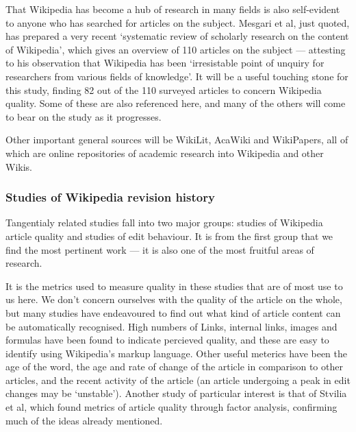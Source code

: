 \documentclass[a4paper,11pt,twoside,notitlepage]{article}
\begin{document}
        That Wikipedia has become a hub of research in many fields is
        also self-evident to anyone who has searched for articles on
        the subject. Mesgari et al, just quoted, has prepared a very
        recent `systematic review of scholarly research on the content
        of Wikipedia', which gives an overview of 110 articles on the
        subject --- attesting to his observation that Wikipedia
        has been `irresistable point of unquiry for researchers from
        various fields of knowledge'. It will be a useful touching
        stone for this study, finding 82 out of the 110 surveyed
        articles to concern Wikipedia quality. Some of these are also
        referenced here, and many of the others will come to bear on
        the study as it progresses.

        Other important general sources will be WikiLit,\cite{wikilit}
        AcaWiki\cite{acawiki} and WikiPapers\cite{wikipapers}, all of
        which are online repositories of academic research into
        Wikipedia and other Wikis.       

        
        \subsubsection*{Studies of Wikipedia revision history}
        Tangentialy related studies fall into two major groups: studies
        of Wikipedia article quality and studies of edit behaviour.
        It is from the first group that we find the most pertinent
        work --- it is also one of the most fruitful areas of
        research.

        It is the metrics used to measure quality in these studies
        that are of most use to us here. We don't concern ourselves
        with the quality of the article on the whole, but many studies
        have endeavoured to find out what kind of article content can
        be automatically recognised. High numbers of Links, internal
        links, images and formulas have been found to indicate
        percieved quality,\cite{Lucassen2010}\cite{mcguinness2006} and
        these are easy to identify using Wikipedia's markup
        language. Other useful meterics have been the age of the
        word,\cite{Cross2006} the age and rate of change of the
        article in comparison to other articles,\cite{Zeng2006} and
        the recent activity of the article (an article undergoing a
        peak in edit changes may be `unstable').\cite{Adler2006}
        Another study of particular interest is that of Stvilia et al,
        which found metrics of article quality through factor
        analysis,\cite{Stvilia2005} confirming much of the ideas
        already mentioned.
\end{document}

